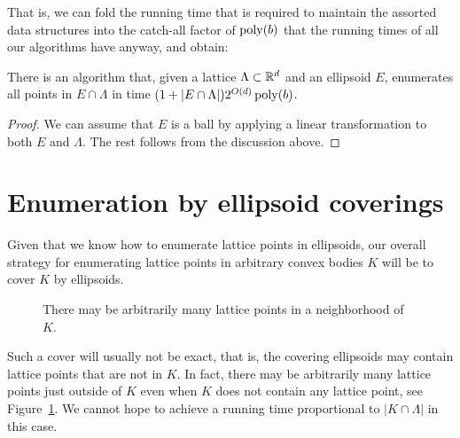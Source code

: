 That is, we can fold the running time that is required to maintain the assorted data structures
into the catch-all factor of $\operatorname{poly}(b)$ that the running times of all our algorithms have anyway,
and obtain:

\begin{theorem}
  There is an algorithm that,
  given a lattice $\Lambda \subset \mathbb{R}^d$ and an ellipsoid $E$,
  enumerates all points in $E \cap \Lambda$ in time
  $(1 + |E \cap \Lambda|) 2^{O(d)} \operatorname{poly}(b)$.
\end{theorem}
\begin{proof}
  We can assume that $E$ is a ball by applying a linear transformation to both $E$ and $\Lambda$.
  The rest follows from the discussion above.
\end{proof}





\section{Enumeration by ellipsoid coverings}

Given that we know how to enumerate lattice points in ellipsoids,
our overall strategy for enumerating lattice points in arbitrary convex bodies $K$
will be to cover $K$ by ellipsoids.

\begin{figure}
  \begin{center}
  \end{center}
  \caption{There may be arbitrarily many lattice points in a neighborhood of $K$.}
  \label{fig:sparse-dense-close-to-K}
\end{figure}

Such a cover will usually not be exact, that is,
the covering ellipsoids may contain lattice points that are not in $K$.
In fact, there may be arbitrarily many lattice points just outside of $K$
even when $K$ does not contain any lattice point,
see Figure~\ref{fig:sparse-dense-close-to-K}.
We cannot hope to achieve a running time proportional to $|K \cap \Lambda|$ in this case.

